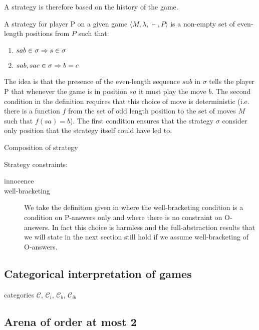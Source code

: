 A strategy is therefore based on the history of the game.

\begin{dfn}[Strategy]
A strategy for player P on a given game $\langle M, \lambda, \vdash, P \rangle$ is a
non-empty set of even-length positions from $P$ such that:
\begin{enumerate}
\item $sab \in \sigma \Rightarrow s \in \sigma$
\item $sab, sac \in \sigma \Rightarrow b = c$
\end{enumerate}
\end{dfn}

The idea is that the presence of the even-length sequence $s a b$ in $\sigma$ tells the player
P that whenever the game is in position $s a$ it must play the move $b$.
The second condition in the definition requires that this choice of move is deterministic
(i.e. there is a function $f$ from the set of odd length position to the set of moves $M$
 such that $f(s a) =b$). The first condition ensures that the strategy $\sigma$ consider only
position that the strategy itself could have led to.


Composition of strategy

Strategy constraints:
\begin{description}
\item[innocence]


\item[well-bracketing]
We take the definition given in \cite{abramsky:game-semantics} where
the well-bracketing condition is a condition on P-answers only and where there is no constraint on O-answers.
In fact this choice is harmless and the full-abstraction results that we will state in the next section
still hold if we assume well-bracketing of O-answers.

\end{description}


\subsection{Categorical interpretation of games}

categories $\mathcal{C}$, $\mathcal{C}_i$, $\mathcal{C}_b$, $\mathcal{C}_{ib}$

\subsection{Arena of order at most 2}

